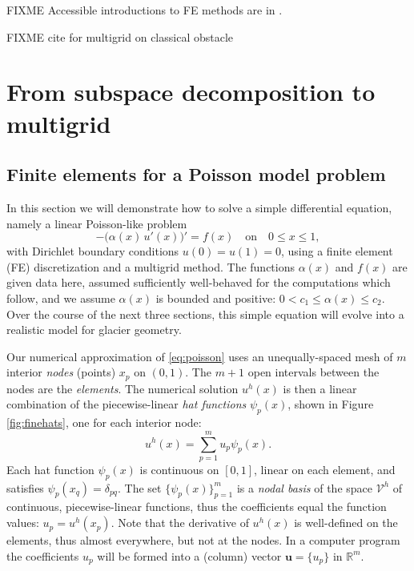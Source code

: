 \documentclass[letterpaper,final,12pt,reqno]{amsart}
\theoremstyle{claim}
\newcommand{\RR}{\mathbb{R}}
\newcommand{\bu}{\mathbf{u}}
\numberwithin{equation}{section}
\numberwithin{figure}{section}
\numberwithin{table}{section}
\numberwithin{theorem}{section}
\begin{document}
FIXME Accessible introductions to FE methods are in \cite{Bueler2021,Elmanetal2014,Johnson2009}.

FIXME cite for multigrid on classical obstacle \cite{BrandtCryer1983,Bueler2021,GraeserKornhuber2009}


\section{From subspace decomposition to multigrid} \label{sec:subspace}

\subsection*{Finite elements for a Poisson model problem}  In this section we will demonstrate how to solve a simple differential equation, namely a linear Poisson-like problem
\begin{equation}
- \big(\alpha(x)\,u'(x)\big)' = f(x) \quad \text{on} \quad 0 \le x \le 1, \label{eq:poisson}
\end{equation}
with Dirichlet boundary conditions $u(0)=u(1)=0$, using a finite element (FE) discretization and a multigrid method.  The functions $\alpha(x)$ and $f(x)$ are given data here, assumed sufficiently well-behaved for the computations which follow, and we assume $\alpha(x)$ is bounded and positive: $0 < c_1 \le \alpha(x) \le c_2$.  Over the course of the next three sections, this simple equation will evolve into a realistic model for glacier geometry.

Our numerical approximation of \eqref{eq:poisson} uses an unequally-spaced mesh of $m$ interior \emph{nodes} (points) $x_p$ on $(0,1)$.  The $m+1$ open intervals between the nodes are the \emph{elements}.  The numerical solution $u^h(x)$ is then a linear combination of the piecewise-linear \emph{hat functions} $\psi_p(x)$, shown in Figure \ref{fig:finehats}, one for each interior node:
\begin{equation}
u^h(x) = \sum_{p=1}^m u_p \psi_p(x). \label{eq:trialsolution}
\end{equation}
Each hat function $\psi_p(x)$ is continuous on $[0,1]$, linear on each element, and satisfies $\psi_p(x_q) = \delta_{pq}$.  The set $\{\psi_p(x)\}_{p=1}^m$ is a \emph{nodal basis} of the space $\mathcal{V}^h$ of continuous, piecewise-linear functions, thus the coefficients equal the function values: $u_p=u^h(x_p)$.  Note that the derivative of $u^h(x)$ is well-defined on the elements, thus almost everywhere, but not at the nodes.  In a computer program the coefficients $u_p$ will be formed into a (column) vector $\bu=\{u_p\}$ in $\RR^m$.
\end{document}
